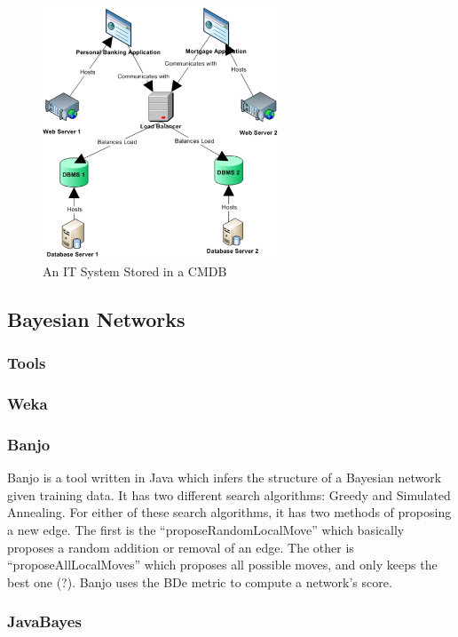 \documentclass{article}
\begin{document}
\begin{figure}[!t]
\centering
\includegraphics[width=7cm]{cmdbExample.PNG}
\caption{An IT System Stored in a CMDB}
\label{fig:cmdbExample}
\end{figure}

\subsection{Bayesian Networks}

\subsubsection{Tools}

\subsubsection*{Weka}

\subsubsection*{Banjo}
Banjo is a tool written in Java which infers the structure of a Bayesian network given training data. It has two different search algorithms: Greedy and
Simulated Annealing. For either of these search algorithms, it has two methods of proposing a new edge. The first is the ``proposeRandomLocalMove''
which basically proposes a random addition or removal of an edge. The other is ``proposeAllLocalMoves'' which proposes all possible moves, and only keeps the
best one (?). Banjo uses the BDe metric to compute a network's score.

\subsubsection*{JavaBayes}
\end{document}
